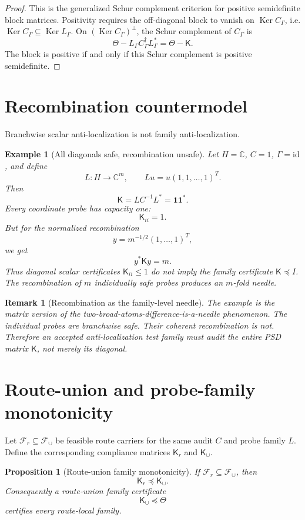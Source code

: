 \documentclass[11pt]{article}
\newtheorem{proposition}{Proposition}
\newtheorem{remark}{Remark}
\newtheorem{example}{Example}
\newcommand{\C}{\mathbb C}
\newcommand{\Ker}{\operatorname{Ker}}
\newcommand{\id}{\mathrm{id}}
\begin{document}
\begin{proof}
This is the generalized Schur complement criterion for positive semidefinite block matrices.  Positivity requires the off-diagonal block to vanish on $\Ker C_\Gamma$, i.e. $\Ker C_\Gamma\subseteq\Ker L_\Gamma$.  On $(\Ker C_\Gamma)^\perp$, the Schur complement of $C_\Gamma$ is
\[
        \Theta-L_\Gamma C_\Gamma^\dagger L_\Gamma^*=\Theta-\mathsf K.
\]
The block is positive if and only if this Schur complement is positive semidefinite.
\end{proof}

\section{Recombination countermodel}
Branchwise scalar anti-localization is not family anti-localization.

\begin{example}[All diagonals safe, recombination unsafe]
Let $H=\C$, $C=1$, $\Gamma=\id$, and define
\[
        L:H\to\C^m,
        \qquad
        Lu=u(1,1,\dots,1)^T.
\]
Then
\[
        \mathsf K=L C^{-1}L^*=\mathbf 1\mathbf 1^*.
\]
Every coordinate probe has capacity one:
\[
        \mathsf K_{ii}=1.
\]
But for the normalized recombination
\[
        y=m^{-1/2}(1,\dots,1)^T,
\]
we get
\[
        y^*\mathsf K y=m.
\]
Thus diagonal scalar certificates $\mathsf K_{ii}\le1$ do not imply the family certificate $\mathsf K\preceq I$.  The recombination of $m$ individually safe probes produces an $m$-fold needle.
\end{example}

\begin{remark}[Recombination as the family-level needle]
The example is the matrix version of the two-broad-atoms-difference-is-a-needle phenomenon.  The individual probes are branchwise safe.  Their coherent recombination is not.  Therefore an accepted anti-localization test family must audit the entire PSD matrix $\mathsf K$, not merely its diagonal.
\end{remark}

\section{Route-union and probe-family monotonicity}
Let $\mathcal F_r\subseteq\mathcal F_\cup$ be feasible route carriers for the same audit $C$ and probe family $L$.  Define the corresponding compliance matrices $\mathsf K_r$ and $\mathsf K_\cup$.

\begin{proposition}[Route-union family monotonicity]
If $\mathcal F_r\subseteq\mathcal F_\cup$, then
\[
        \boxed{\mathsf K_r\preceq\mathsf K_\cup.}
\]
Consequently a route-union family certificate
\[
        \mathsf K_\cup\preceq\Theta
\]
certifies every route-local family.
\end{proposition}
\end{document}
